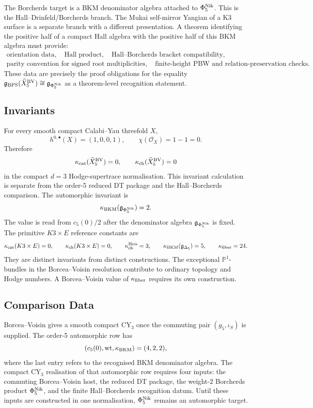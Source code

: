 The Borcherds target is a BKM denominator algebra attached to
\(\Phi_{5}^{\mathrm{Nik}}\).  This is the Hall--Drinfeld/Borcherds branch.  The Mukai
self-mirror Yangian of a K3 surface is a separate branch with a
different presentation.  A theorem identifying the positive half of a
compact Hall algebra with the positive half of this BKM algebra must
provide:
\[
\begin{gathered}
  \text{orientation data},\quad
  \text{Hall product},\quad
  \text{Hall--Borcherds bracket compatibility},\\
  \text{parity convention for signed root multiplicities},\quad
  \text{finite-height PBW and relation-preservation checks}.
\end{gathered}
\]
These data are precisely the proof obligations for the equality
\(\mathfrak g_{\mathrm{BPS}}(\widehat X_5^{\mathrm{BV}})\cong\mathfrak g_{\Phi_{5}^{\mathrm{Nik}}}\)
as a theorem-level recognition statement.

\subsection*{Invariants}

For every smooth compact Calabi--Yau threefold \(X\),
\[
  h^{0,\bullet}(X)=(1,0,0,1),\qquad
  \chi(\mathcal O_X)=1-1=0 .
\]
Therefore
\[
  \kappa_{\mathrm{cat}}(\widehat X_5^{\mathrm{BV}})=0,\qquad
  \kappa_{\mathrm{ch}}(\widehat X_5^{\mathrm{BV}})=0
\]
in the compact \(d=3\) Hodge-supertrace normalisation.  This invariant
calculation is separate from the order-5 reduced DT package and the
Hall--Borcherds comparison.  The automorphic invariant is
\[
  \kappa_{\mathrm{BKM}}(\mathfrak g_{\Phi_{5}^{\mathrm{Nik}}})=2 .
\]
The value is read from \(c_5(0)/2\) after the denominator algebra
\(\mathfrak g_{\Phi_{5}^{\mathrm{Nik}}}\) is fixed.  The primitive \(K3\times E\)
reference constants are
\[
  \kappa_{\mathrm{cat}}(K3\times E)=0,\qquad
  \kappa_{\mathrm{ch}}(K3\times E)=0,\qquad
  \kappa_{\mathrm{ch}}^{\mathrm{Heis}}=3,\qquad
  \kappa_{\mathrm{BKM}}(\mathfrak g_{\Delta_5})=5,\qquad
  \kappa_{\mathrm{fiber}}=24 .
\]
They are distinct invariants from distinct constructions.  The exceptional
\(\mathbb P^1\)-bundles in the Borcea--Voisin resolution contribute to
ordinary topology and Hodge numbers.  A Borcea--Voisin value of
\(\kappa_{\mathrm{fiber}}\) requires its own construction.

\subsection*{Comparison Data}

Borcea--Voisin gives a smooth compact CY$_3$ once the commuting pair
\((g_5,\iota_S)\) is supplied.  The order-5 automorphic row has
\[
  (c_5(0),\mathrm{wt},\kappa_{\mathrm{BKM}})=(4,2,2),
\]
where the last entry refers to the recognised BKM denominator algebra.
The compact CY$_3$ realisation of that automorphic row requires four
inputs: the commuting Borcea--Voisin host, the reduced DT package, the
weight-\(2\) Borcherds product \(\Phi_{5}^{\mathrm{Nik}}\), and the finite
Hall--Borcherds recognition datum.  Until these inputs are constructed
in one normalisation, \(\Phi_{5}^{\mathrm{Nik}}\) remains an automorphic target.

